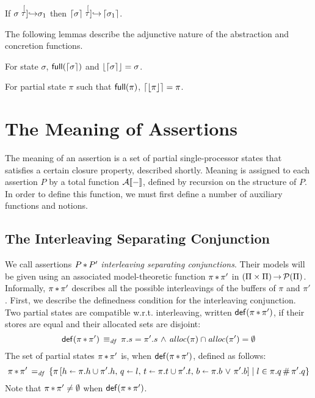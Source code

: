 \documentclass[11pt]{report}
\begin{document}
\begin{lemma}
	\label{lem:abst-tau}
	If $\sigma \stackrel[\tau]{}{\operatorname{\hookrightarrow}} \sigma_1$ then $\left\lceil\sigma\right\rceil \stackrel[\tau]{}{\operatorname{\hookrightarrow}} \left\lceil\sigma_1\right\rceil$. 
\end{lemma}

The following lemmas describe the adjunctive nature of the abstraction and concretion functions.

\begin{lemma}
	\label{lem:concst-abst}
	For state $\sigma$, $\mathsf{full}(\left\lceil\sigma\right\rceil)$ and $\left\lfloor\left\lceil\sigma\right\rceil\right\rfloor = \sigma$. 
\end{lemma}

\begin{lemma}
	\label{lem:abst-concst}
	For partial state $\pi$ such that $\mathsf{full}(\pi)$, $\left\lceil\left\lfloor\pi\right\rfloor\right\rceil = \pi$.
\end{lemma}

\section{The Meaning of Assertions} %
\label{sec:assertion-semantics}

The meaning of an assertion is a set of partial single-processor states that satisfies a certain closure property, described shortly. Meaning is assigned to each assertion $P$ by a total function $\mathcal{A}[\![-]\!]$, defined by recursion on the structure of $P$. In order to define this function, we must first define a number of auxiliary functions and notions.

\subsection{The Interleaving Separating Conjunction}

We call assertions $P \operatorname{\ast} P'$ \emph{interleaving separating conjunctions}. Their models will be given using an associated model-theoretic function $\pi \operatorname{\ast} \pi'$ in $(\Pi \times \Pi) \operatorname{\rightarrow} \mathcal{P}(\Pi)$. Informally, $\pi \operatorname{\ast} \pi'$ describes all the possible interleavings of the buffers of $\pi$ and $\pi'$. First, we describe the definedness condition for the interleaving conjunction. Two partial states are compatible w.r.t. interleaving, written $\mathsf{def}(\pi \operatorname{\ast} \pi')$, if their stores are equal and  their allocated sets are disjoint: \[ \mathsf{def}(\pi \operatorname{\ast} \pi') \operatorname{\;\equiv_{\mathit{df}}\;} \pi.s = \pi'.s \operatorname{\,\wedge\,} \mathit{alloc}(\pi) \cap \mathit{alloc}(\pi') = \operatorname{\emptyset} \]
The set of partial states $\pi \operatorname{\ast} \pi'$ is, when $\mathsf{def}(\pi \operatorname{\ast} \pi')$, defined as follows:\[ 
	\pi \operatorname{\ast} \pi' \operatorname{\;=_{\mathit{df}}\;} \left\lbrace \pi \left[ h \shortleftarrow \pi.h \cup \pi'.h,\,q \shortleftarrow l,\, t \shortleftarrow \pi.t \cup \pi'.t,\,b \shortleftarrow \pi.b \operatorname{\,\vee\,} \pi'.b  \right] \mid l \in \pi.q \,\#\, \pi'.q \right\rbrace
\] Note that $\pi \operatorname{\ast} \pi' \neq \operatorname{\emptyset}$ when $\mathsf{def}(\pi \operatorname{\ast} \pi')$.
\end{document}

